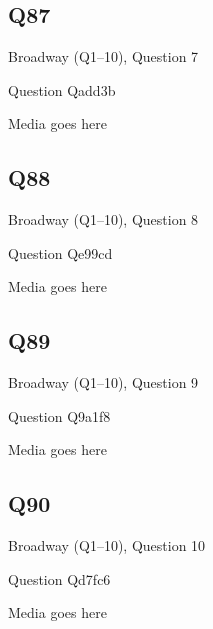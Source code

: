 \documentclass[11pt]{beamer}
\begin{document}
\subsection*{Q87}
\begin{frame}[t]{Broadway (Q1--10), Question 7}
\vspace{2em}
\begin{block}{Question}
Qadd3b
\end{block}
\begin{center}
Media goes here
\end{center}
\end{frame}
    

\subsection*{Q88}
\begin{frame}[t]{Broadway (Q1--10), Question 8}
\vspace{2em}
\begin{block}{Question}
Qe99cd
\end{block}
\begin{center}
Media goes here
\end{center}
\end{frame}
    

\subsection*{Q89}
\begin{frame}[t]{Broadway (Q1--10), Question 9}
\vspace{2em}
\begin{block}{Question}
Q9a1f8
\end{block}
\begin{center}
Media goes here
\end{center}
\end{frame}
    

\subsection*{Q90}
\begin{frame}[t]{Broadway (Q1--10), Question 10}
\vspace{2em}
\begin{block}{Question}
Qd7fc6
\end{block}
\begin{center}
Media goes here
\end{center}
\end{frame}
    
\end{document}
